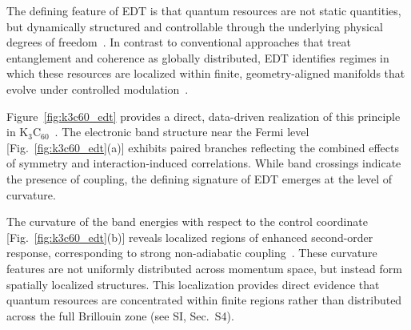 \documentclass[twocolumn,10pt]{article}
\begin{document}


The defining feature of EDT is that quantum resources are not static quantities, but dynamically structured and controllable through the underlying physical degrees of freedom~\cite{Amico2008,Eisert2010}. In contrast to conventional approaches that treat entanglement and coherence as globally distributed, EDT identifies regimes in which these resources are localized within finite, geometry-aligned manifolds that evolve under controlled modulation~\cite{Verstraete2008,Orus2014}.

Figure~\ref{fig:k3c60_edt} provides a direct, data-driven realization of this principle in K$_3$C$_{60}$~\cite{Gunnarsson1997,Capone2009}. The electronic band structure near the Fermi level [Fig.~\ref{fig:k3c60_edt}(a)] exhibits paired branches reflecting the combined effects of symmetry and interaction-induced correlations. While band crossings indicate the presence of coupling, the defining signature of EDT emerges at the level of curvature.

The curvature of the band energies with respect to the control coordinate [Fig.~\ref{fig:k3c60_edt}(b)] reveals localized regions of enhanced second-order response, corresponding to strong non-adiabatic coupling~\cite{Mead1979,Yarkony1996}. These curvature features are not uniformly distributed across momentum space, but instead form spatially localized structures. This localization provides direct evidence that quantum resources are concentrated within finite regions rather than distributed across the full Brillouin zone (see SI, Sec.~S4).
\end{document}
